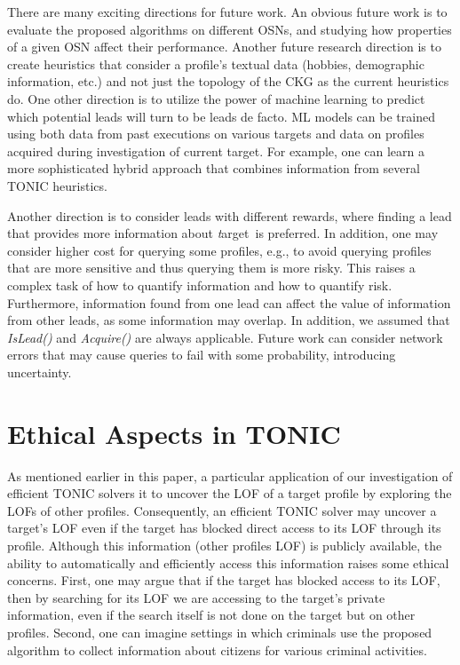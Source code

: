 \documentclass[prodmode,acmtecs]{acmsmall} %
\newcommand{\note}[2]{\textbf{\textsc{#1} says: \textit{#2}}}
\newcommand{\islead}[1]{{\em IsLead(#1)}}
\newcommand{\acquire}[1]{{\em Acquire(#1)}}
\newcommand{\target}{{\textit target}}
\begin{document}


There are many exciting directions for future work.
An obvious future work is to evaluate the proposed algorithms on different OSNs, and studying how properties of a given OSN affect their performance. 
Another future research direction is to create heuristics that consider a profile's textual data (hobbies, demographic information, etc.) and not just the topology of the CKG as the current heuristics do.
One other direction is to utilize the power of machine learning to predict which potential leads will turn to be leads de facto.
ML models can be trained using both data from past executions on various targets and data on profiles acquired during investigation of current target. 
For example, one can learn a more sophisticated hybrid approach that combines information from several TONIC heuristics. 

Another direction is to consider leads with different rewards, where finding a lead that provides more information about \target\ is preferred. 
In addition, one may consider higher cost for querying some profiles, e.g., to avoid querying profiles that are more sensitive and thus querying them is more risky. This raises a complex task of how to quantify information and how to quantify risk. Furthermore, information found from one lead can affect the value of information from other leads, as some information may overlap. In addition, we assumed that \islead{} and \acquire{} are always applicable. Future work can consider network errors that may cause queries to fail with some probability, introducing uncertainty.




\section{Ethical Aspects in TONIC}
\label{sec:ethics}

As mentioned earlier in this paper, a particular application of our investigation of efficient TONIC solvers it to uncover the LOF of a target profile 
by exploring the LOFs of other profiles. Consequently, an efficient TONIC solver may uncover a target's LOF even if the target has blocked direct access to its LOF through its profile. Although this information (other profiles LOF) is publicly available, the ability to automatically and efficiently access this information raises some ethical concerns. 
First, one may argue that if the target has blocked access to its LOF, then by searching for its LOF we are accessing to the target's private information, even if the search itself is not done on the target but on other profiles. 
Second, one can imagine settings in which criminals use the proposed algorithm to collect information about citizens for various criminal activities. 
\end{document}
